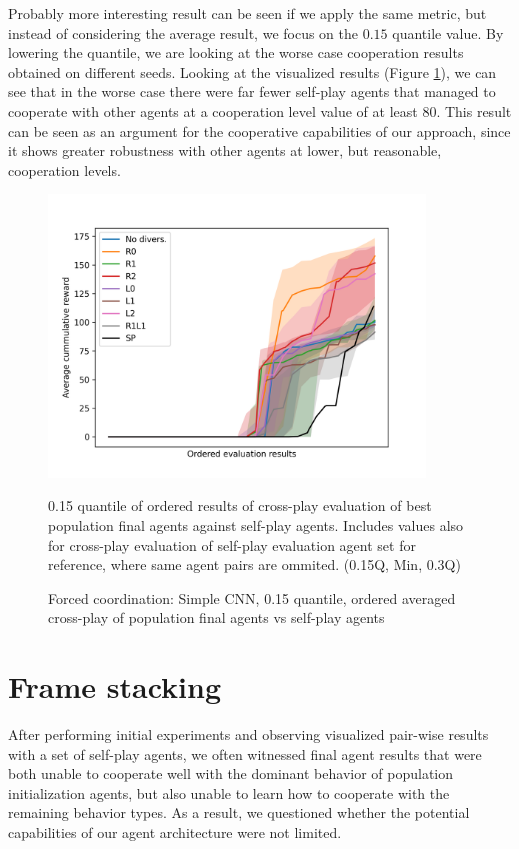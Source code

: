 Probably more interesting result can be seen if we apply the same metric, but instead of considering the average result, we focus on the $0.15$ quantile value.
By lowering the quantile, we are looking at the worse case cooperation results obtained on different seeds.
Looking at the visualized results (Figure \ref{SimpleCNNOrderedAvg0.15Q}), we can see that in the worse case there were far fewer self-play agents that managed to cooperate with other agents at a cooperation level value of at least 80.
This result can be seen as an argument for the cooperative capabilities of our approach, since it shows greater robustness with other agents at lower, but reasonable, cooperation levels.



\begin{figure}[!ht]
    \centering
    \includegraphics*[width=10cm]{../img/SimpleCNNOrderedAvg0.15Q.png}

    \caption{Forced coordination: Simple CNN, 0.15 quantile, ordered averaged cross-play of population final agents vs self-play agents}
    \label{SimpleCNNOrderedAvg0.15Q}
    \medskip
    \small 
    0.15 quantile of ordered results of cross-play evaluation of best population final agents against self-play agents.
    Includes values also for cross-play evaluation of self-play evaluation agent set for reference, where same agent pairs are ommited.
    (0.15Q, Min, 0.3Q)

\end{figure}

\newpage


\section{Frame stacking}
After performing initial experiments and observing visualized pair-wise results with a set of self-play agents, we often witnessed final agent results that were both unable to cooperate well with the dominant behavior of population initialization agents, but also unable to learn how to cooperate with the remaining behavior types.
As a result, we questioned whether the potential capabilities of our agent architecture were not limited.

